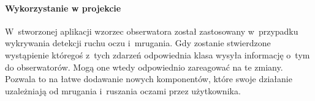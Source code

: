 \paragraph{Wykorzystanie w projekcie} W~stworzonej aplikacji wzorzec obserwatora został zastosowany w~przypadku wykrywania detekcji ruchu oczu i~mrugania. Gdy zostanie stwierdzone wystąpienie któregoś z~tych zdarzeń odpowiednia klasa wysyła informację o~tym do obserwatorów. Mogą one wtedy odpowiednio zareagować na te zmiany. Pozwala to na łatwe dodawanie nowych komponentów, które swoje działanie uzależniają od mrugania i~ruszania oczami przez użytkownika. 